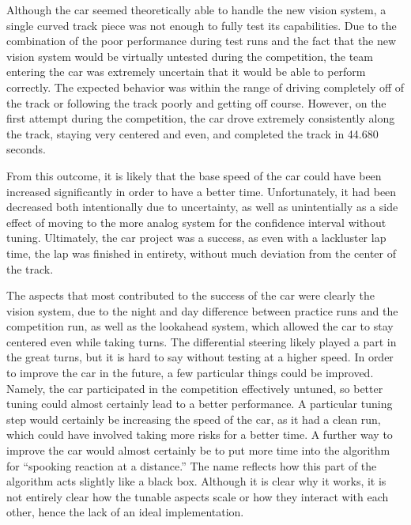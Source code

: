 \documentclass[conference]{IEEEtran}
\begin{document}
    Although the car seemed theoretically able to handle the new vision system, a single curved track piece was not enough to fully test its capabilities.
    Due to the combination of the poor performance during test runs and the fact that the new vision system would be virtually untested during the competition, the team entering the car
    was extremely uncertain that it would be able to perform correctly.
    The expected behavior was within the range of driving completely off of the track or following the track poorly and getting off course.
    However, on the first attempt during the competition, the car drove extremely consistently along the track, staying very centered and even, and completed the track in 44.680 seconds.

    From this outcome, it is likely that the base speed of the car could have been increased significantly in order to have a better time. Unfortunately, it had been decreased both intentionally
    due to uncertainty, as well as unintentially as a side effect of moving to the more analog system for the confidence interval without tuning. Ultimately, the car project was a success, as even
    with a lackluster lap time, the lap was finished in entirety, without much deviation from the center of the track.

    The aspects that most contributed to the success of the car were clearly the vision system, due to the night and day difference between practice runs and the competition run, as well as the lookahead system,
    which allowed the car to stay centered even while taking turns. The differential steering likely played a part in the great turns, but it is hard to say without testing at a higher speed. In order to improve
    the car in the future, a few particular things could be improved. Namely, the car participated in the competition effectively untuned, so better tuning could almost certainly lead to a better performance.
    A particular tuning step would certainly be increasing the speed of the car, as it had a clean run, which could have involved taking more risks for a better time.
    A further way to improve the car would almost certainly be to put more time into the algorithm for ``spooking reaction at a distance.''
    The name reflects how this part of the algorithm acts slightly like a black box. 
    Although it is clear why it works, it is not entirely clear how the tunable aspects scale or how they interact with each other, hence the lack of an ideal implementation.
\end{document}
